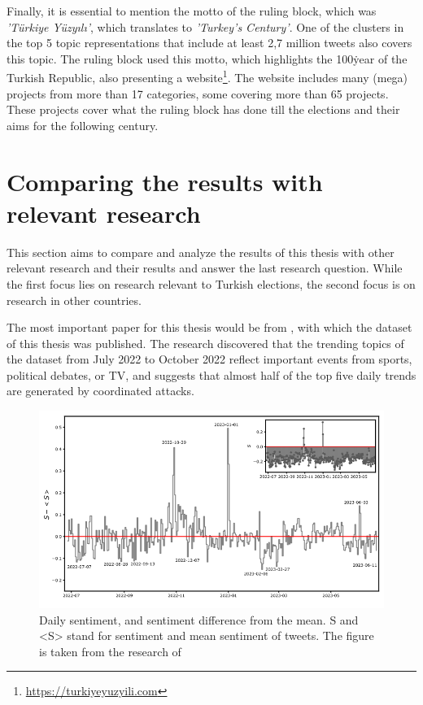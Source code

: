 Finally, it is essential to mention the motto of the ruling block, which was 
\textit{'Türkiye Yüzyılı'}, which translates to \textit{'Turkey's Century'}. One of the clusters 
in the top 5 topic representations that include at least 2,7 million tweets also covers this topic. 
The ruling block used this motto, which highlights the 100\. year of the Turkish Republic, also 
presenting a website\footnote{\url{https://turkiyeyuzyili.com}}. The website includes many 
(mega) projects from more than 17 categories, some covering more than 65 projects. 
These projects cover what the ruling block has done till the elections and their aims for the 
following century.



\section{Comparing the results with relevant research}

This section aims to compare and analyze the results of this thesis with other relevant research and 
their results and answer the last research question. While the first focus lies on research relevant 
to Turkish elections, the second focus is on research in other countries.

The most important paper for this thesis would be from \textcite{secim2023}, with which the dataset 
of this thesis was published. The research discovered that the trending topics of the dataset from 
July 2022 to October 2022 reflect important events from sports, political debates, or TV, and 
suggests that almost half of the top five daily trends are generated by coordinated attacks. 

\begin{figure}[h!]
    \centering
    \includegraphics[width=\linewidth]{figures/sentiment_plot.png}
    \caption[Daily sentiment analysis]
    {Daily sentiment, and sentiment difference from the mean. S and <S> stand for sentiment and mean 
    sentiment of tweets. The figure is taken
    from the research of \textcite{turkishbertweet_2023}}\label{fig:sentiment_analysis}
\end{figure}

